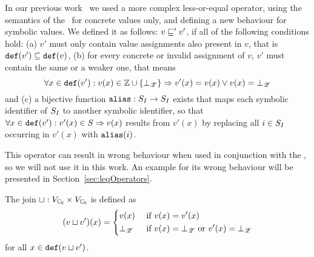 \begin{enumerate}[leftmargin=*, label=\arabic*.]
  In our previous work \cite{Lemberger2015}\ we used a more complex less-or-equal operator, using the semantics of the \ for concrete values only, and defining a new behaviour for symbolic values. We defined it as follows:
  $v \sqsubseteq' v'$, if all of the following conditions hold:
  (a) $v'$ must only contain value assignments also present in $v$, that is $\texttt{def}(v') \subseteq \texttt{def}(v)$,
  (b) for every concrete or invalid assignment of $v$, $v'$ must contain the same or a weaker one,
  that means \[\forall x \in \texttt{def}(v') : v(x) \in \mathbb{Z} \cup \{\bot_{\mathscr{Z}}\} \Rightarrow v'(x) = v(x) \vee v(x) = \bot_{\mathscr{Z}}\]
  and 
	(c) a bijective function $\texttt{alias} : S_I \rightarrow S_I$ exists that maps each symbolic identifier of $S_I$ to another symbolic identifier, so that
	$\forall x \in \texttt{def}(v') : v'(x) \in S \Rightarrow v(x)$ results from $v'(x)$ by replacing all $i \in S_I$ occurring in $v'(x)$ with $\texttt{alias}(i)$.

This operator can result in wrong behaviour when used in conjunction with the \constraintsCPA,
so we will not use it in this work.
An example for its wrong behaviour will be presented in Section~\ref{sec:leqOperators}.



	The join $\sqcup : V_{\mathbb{C_{S}}} \times V_{\mathbb{C_{S}}}$ is defined as
	\[(v \sqcup v')(x) = \begin{dcases}
		v(x) & \text{ if } v(x) = v'(x)\\
		\bot_{\mathscr{Z}} & \text{ if } v(x) = \bot_{\mathscr{Z}} \text{ or } v'(x) = \bot_{\mathscr{Z}}
	\end{dcases}\]
	for all $x \in \texttt{def}(v \sqcup v')$.


\end{enumerate}
